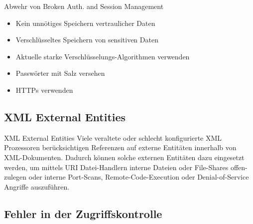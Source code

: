 \begin{bonus}{Abwehr von Broken Auth. and Session Management}
    \begin{itemize}
        \item Kein unnötiges Speichern vertraulicher Daten
        \item Verschlüsseltes Speichern von sensitiven Daten
        \item Aktuelle starke Verschlüsselungs-Algorithmen verwenden
        \item Passwörter mit Salz versehen
        \item HTTPs verwenden
    \end{itemize}



\end{bonus}

\subsection{XML External Entities}

\begin{bonus}{XML External Entities}
    Viele veraltete oder schlecht konfigurierte XML Prozessoren berücksichtigen Referenzen auf externe Entitäten innerhalb von XML-Dokumenten.
    Dadurch können solche externen Entitäten dazu eingesetzt werden, um mittels URI Datei-Handlern interne Dateien oder File-Shares offen-zulegen oder interne Port-Scans, Remote-Code-Execution oder Denial-of-Service Angriffe auszuführen.
\end{bonus}

\subsection{Fehler in der Zugriffskontrolle}


